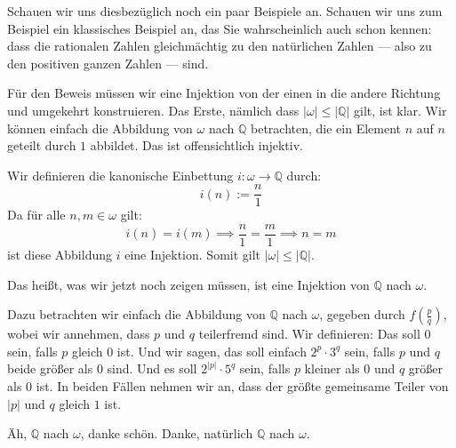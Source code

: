 \begin{spoken-clean}[00:30:49 - 00:32:41]
Schauen wir uns diesbezüglich noch ein paar Beispiele an. Schauen wir uns zum Beispiel ein klassisches Beispiel an, das Sie wahrscheinlich auch schon kennen: dass die rationalen Zahlen gleichmächtig zu den natürlichen Zahlen --- also zu den positiven ganzen Zahlen --- sind.

Für den Beweis müssen wir eine Injektion von der einen in die andere Richtung und umgekehrt konstruieren. Das Erste, nämlich dass $|\omega| \le |\mathbb{Q}|$ gilt, ist klar. Wir können einfach die Abbildung von $\omega$ nach $\mathbb{Q}$ betrachten, die ein Element $n$ auf $n$ geteilt durch $1$ abbildet. Das ist offensichtlich injektiv.
\end{spoken-clean}

\begin{math-stroke}
\begin{short-proof}
Wir definieren die kanonische Einbettung $i \colon \omega \to \mathbb{Q}$ durch:
\[
i(n) := \frac{n}{1}
\]
Da für alle $n, m \in \omega$ gilt:
\[
i(n) = i(m) \implies \frac{n}{1} = \frac{m}{1} \implies n = m
\]
ist diese Abbildung $i$ eine Injektion. Somit gilt $|\omega| \le |\mathbb{Q}|$.
\end{short-proof}
\end{math-stroke}

\begin{spoken-clean}[00:32:41 - 00:33:40]
Das heißt, was wir jetzt noch zeigen müssen, ist eine Injektion von $\mathbb{Q}$ nach $\omega$.

Dazu betrachten wir einfach die Abbildung von $\mathbb{Q}$ nach $\omega$, gegeben durch $f\left(\frac{p}{q}\right)$, wobei wir annehmen, dass $p$ und $q$ teilerfremd sind. Wir definieren: Das soll $0$ sein, falls $p$ gleich $0$ ist. Und wir sagen, das soll einfach $2^p \cdot 3^q$ sein, falls $p$ und $q$ beide größer als $0$ sind. Und es soll $2^{|p|} \cdot 5^q$ sein, falls $p$ kleiner als $0$ und $q$ größer als $0$ ist. In beiden Fällen nehmen wir an, dass der größte gemeinsame Teiler von $|p|$ und $q$ gleich $1$ ist.
\end{spoken-clean}

\begin{student-interaction}
Äh, $\mathbb{Q}$ nach $\omega$, danke schön. Danke, natürlich $\mathbb{Q}$ nach $\omega$.
\end{student-interaction}

